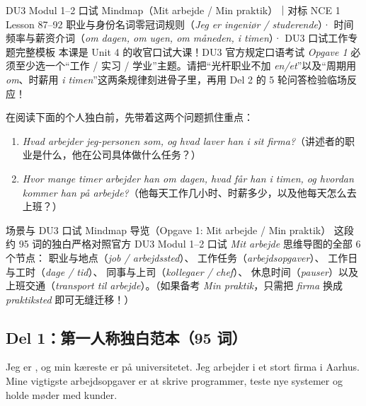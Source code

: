 {DU3 Modul 1--2 口试 Mindmap（Mit arbejde / Min praktik）｜对标 NCE 1 Lesson 87--92}
{职业与身份名词零冠词规则（\textit{Jeg er ingeniør / studerende}）· 时间频率与薪资介词（\textit{om dagen, om ugen, om måneden, i timen}）· DU3 口试工作专题完整模板}
{本课是 Unit 4 的收官口试大课！DU3 官方规定口语考试 \textit{Opgave 1} 必须至少选一个“工作 / 实习 / 学业”主题。请把“光杆职业不加 \textit{en/et}”以及“周期用 \textit{om}、时薪用 \textit{i timen}”这两条规律刻进骨子里，再用 Del 2 的 5 轮问答检验临场反应！}

\begin{foerduleaeser}
在阅读下面的个人独白前，先带着这两个问题抓住重点：
\begin{enumerate}
  \item \textit{Hvad arbejder jeg-personen som, og hvad laver han i sit firma?}（讲述者的职业是什么，他在公司具体做什么任务？）
  \item \textit{Hvor mange timer arbejder han om dagen, hvad får han i timen, og hvordan kommer han på arbejde?}（他每天工作几小时、时薪多少，以及他每天怎么去上班？）
\end{enumerate}
\end{foerduleaeser}


\begin{tipbox}{场景与 DU3 口试 Mindmap 导览（Opgave 1: Mit arbejde / Min praktik）}
这段约 95 词的独白严格对照官方 DU3 Modul 1--2 口试 \textit{Mit arbejde} 思维导图的全部 6 个节点： 职业与地点（\textit{job / arbejdssted}）、 工作任务（\textit{arbejdsopgaver}）、 工作日与工时（\textit{dage / tid}）、 同事与上司（\textit{kollegaer / chef}）、 休息时间（\textit{pauser}）以及  上班交通（\textit{transport til arbejde}）。（如果备考 \textit{Min praktik}，只需把 \textit{firma} 换成 \textit{praktiksted} 即可无缝迁移！）
\end{tipbox}

\subsection*{Del 1：第一人称独白范本（95 词）}

Jeg er , og min kæreste er  på universitetet. Jeg arbejder i et stort firma i Aarhus. Mine vigtigste arbejdsopgaver er at skrive programmer, teste nye systemer og holde møder med kunder.

